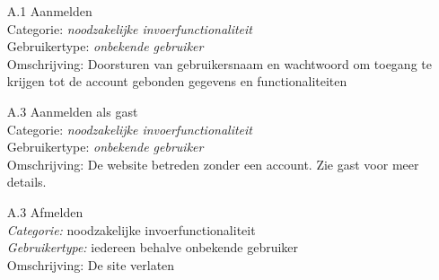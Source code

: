 \documentclass{article}
\begin{document}
\begin{itemize}
\item[A.1] Aanmelden \\
Categorie: \textit{noodzakelijke invoerfunctionaliteit} \\
Gebruikertype: \textit{onbekende gebruiker} \\
Omschrijving: Doorsturen van gebruikersnaam en wachtwoord om toegang te krijgen tot de account gebonden gegevens en functionaliteiten \\[-3mm]

\item[A.3] Aanmelden als gast \\
Categorie: \textsl{noodzakelijke invoerfunctionaliteit} \\
Gebruikertype: \textsl{onbekende gebruiker} \\
Omschrijving: De website betreden zonder een account. Zie gast voor meer details. \\[-3mm]

\item[A.3] Afmelden \\
\textit{Categorie: }noodzakelijke invoerfunctionaliteit \\
\textit{Gebruikertype:} iedereen behalve onbekende gebruiker \\
Omschrijving: De site verlaten \\[-3mm]
\end{itemize}
\end{document}
